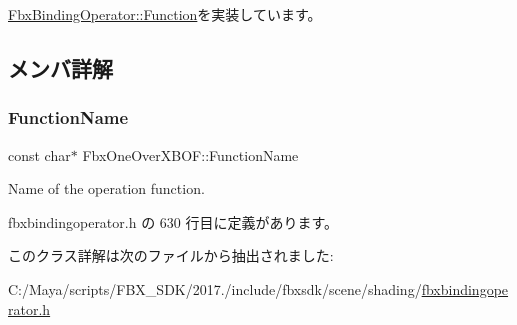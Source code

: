 \hyperlink{class_fbx_binding_operator_1_1_function_a9bbeec993a6e453a6569e7f40a85fd52}{Fbx\+Binding\+Operator\+::\+Function}を実装しています。



\subsection{メンバ詳解}
\mbox{\label{class_fbx_one_over_x_b_o_f_a17b7276cdb45a9c396edc78b33a6a9c7}} 
\subsubsection{\texorpdfstring{Function\+Name}{FunctionName}}
{\footnotesize\ttfamily const char$\ast$ Fbx\+One\+Over\+X\+B\+O\+F\+::\+Function\+Name\hspace{0.3cm}{\ttfamily [static]}}



Name of the operation function. 



 fbxbindingoperator.\+h の 630 行目に定義があります。



このクラス詳解は次のファイルから抽出されました\+:\begin{DoxyCompactItemize}
\item 
C\+:/\+Maya/scripts/\+F\+B\+X\+\_\+\+S\+D\+K/2017./include/fbxsdk/scene/shading/\hyperlink{fbxbindingoperator_8h}{fbxbindingoperator.\+h}\end{DoxyCompactItemize}
